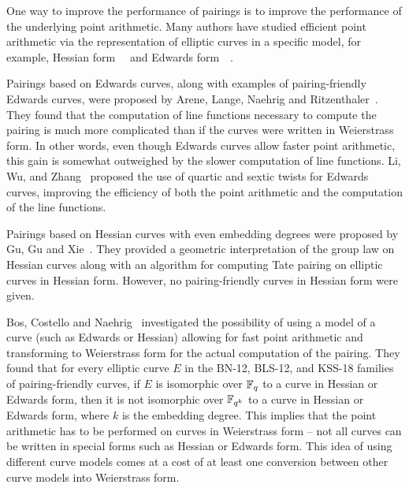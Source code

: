 One way to improve the performance of pairings is
to improve the performance of the underlying point arithmetic.
Many authors have studied efficient point arithmetic via the 
representation of elliptic curves in a specific model,
for example, Hessian form~\cite{2001/smart}~\cite{2001/joye} and
Edwards form~\cite{2007/edwards}~\cite{2007/bernstein-newelliptic}.

Pairings based on Edwards curves,
along with examples of pairing-friendly Edwards curves,
were proposed by Arene, Lange, Naehrig and Ritzenthaler~\cite{2009/fastertate}.
They found that the computation of line functions necessary to compute the pairing
is much more complicated than if the curves were written in Weierstrass form.
In other words,
even though Edwards curves allow faster point arithmetic,
this gain is somewhat outweighed by the slower computation of line functions.
Li, Wu, and Zhang~\cite{2014/LWZ} proposed the use of quartic and sextic twists
for Edwards curves, improving the efficiency of both the point arithmetic and
the computation of the line functions.

Pairings based on Hessian curves with even embedding degrees were proposed by Gu, Gu and Xie~\cite{2010/Gu}.
They provided a geometric interpretation of the group law on Hessian curves
along with an algorithm for computing Tate pairing on elliptic curves in Hessian form.
However, no pairing-friendly curves in Hessian form were given.

Bos, Costello and Naehrig~\cite{2013/bos-pairing} investigated the possibility of
using a model of a curve (such as Edwards or Hessian) allowing for fast point arithmetic
and transforming to Weierstrass form for the actual computation of the pairing.
They found that for every elliptic curve $E$ in the BN-12, BLS-12, and KSS-18 families of pairing-friendly curves,
if $E$ is isomorphic over $\mathbb{F}_{q}$ to a curve in Hessian or Edwards form,
then it is not isomorphic over $\mathbb{F}_{q^{k}}$ to a curve in Hessian or Edwards form,
where $k$ is the embedding degree.
This implies that the point arithmetic has to be performed on curves in Weierstrass form -- not all curves can be written in special forms such as Hessian or Edwards form.
This idea of using different curve models comes at a cost of at least one conversion
between other curve models into Weierstrass form.

